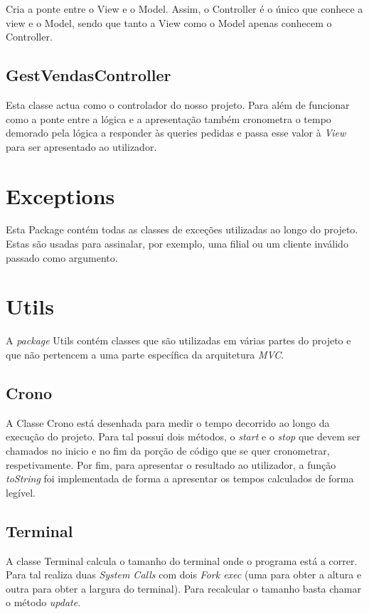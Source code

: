 \documentclass[a4paper]{report}
\begin{document}
Cria a ponte entre o View e o Model. Assim, o Controller é o único que conhece a view e o
Model, sendo que tanto a View como o Model apenas conhecem o Controller.

\subsection{GestVendasController}

Esta classe actua como o controlador do nosso projeto. Para além de funcionar como a ponte entre
a lógica e a apresentação também cronometra o tempo demorado pela lógica a responder às queries pedidas
e passa esse valor à \textit{View} para ser apresentado ao utilizador.

\section{Exceptions}

Esta Package contém todas as classes de exceções utilizadas ao longo do projeto.
Estas são usadas para assinalar, por exemplo, uma filial ou um cliente inválido passado
como argumento.

\section{Utils}

A \textit{package} Utils contém classes que são utilizadas em várias partes do projeto e que não
pertencem a uma parte específica da arquitetura \textit{MVC}.

\subsection{Crono}

A Classe Crono está desenhada para medir o tempo decorrido ao longo da execução do projeto.
Para tal possui dois métodos, o \textit{start} e o \textit{stop} que devem ser chamados no
inicio e no fim da porção de código que se quer cronometrar, respetivamente.
Por fim, para apresentar o resultado ao utilizador, a função \textit{toString} foi implementada
de forma a apresentar os tempos calculados de forma legível.

\subsection{Terminal}

A classe Terminal calcula o tamanho do terminal onde o programa está a correr.
Para tal realiza duas \textit{System Calls} com dois \textit{Fork exec} (uma para obter a altura
e outra para obter a largura do terminal).
Para recalcular o tamanho basta chamar o método \textit{update}.
\end{document}
